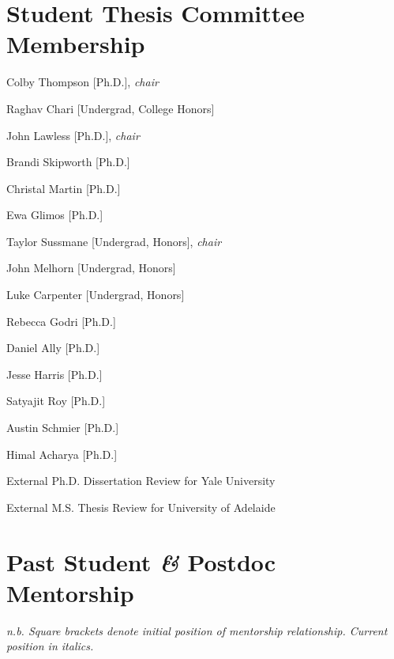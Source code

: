 \documentclass[11pt,letterpaper]{article}
\begin{document}
{    \section*{Student Thesis Committee Membership}

    \begin{itemizetighter}
      \item Colby Thompson [Ph.D.], \emph{chair} 
      \item Raghav Chari [Undergrad, College Honors] 
      \item John Lawless [Ph.D.], \emph{chair} 
      \item Brandi Skipworth [Ph.D.] 
      \item Christal Martin [Ph.D.] 
      \item Ewa Glimos [Ph.D.] 
      \item Taylor Sussmane [Undergrad, Honors], \emph{chair} 
      \item John Melhorn [Undergrad, Honors] 
      \item Luke Carpenter [Undergrad, Honors] 
      \item Rebecca Godri [Ph.D.] 
      \item Daniel Ally [Ph.D.] 
      \item Jesse Harris [Ph.D.] 
      \item Satyajit Roy [Ph.D.] 
      \item Austin Schmier [Ph.D.] 
      \item Himal Acharya [Ph.D.] 
      \item External Ph.D. Dissertation Review for Yale University 
      \item External M.S. Thesis Review for University of Adelaide 
    \end{itemizetighter}

  }

  \section*{Past Student \textit{\&} Postdoc Mentorship}


  \textit{n.b. Square brackets denote initial position of mentorship relationship. Current position in italics.}
\end{document}
